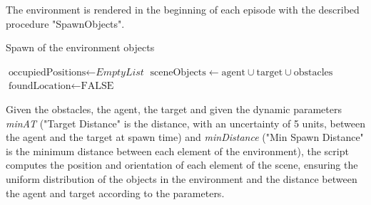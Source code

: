 \documentclass{ifacconf}
\begin{document}
The environment is rendered in the beginning of each episode with the described procedure "SpawnObjects".

\begin{algorithm}
\caption{Spawn of the environment objects}\label{alg:spawn}
\begin{algorithmic}[1]
\State $\text{occupiedPositions} \gets \textit{EmptyList}$
\State $\text{sceneObjects} \gets \text{agent} \cup \text{target} \cup \text{obstacles}$
\State $\text{foundLocation} \gets \text{FALSE}$
\Repeat
{}
\Else
{}
\EndIf
{}
\State {}
\EndFor
\EndProcedure
\end{algorithmic}
\end{algorithm}

Given the obstacles, the agent, the target and given the dynamic parameters \emph{minAT} ("Target Distance" is the distance, with an uncertainty of 5 units, between the agent and the target at spawn time) and \emph{minDistance} ("Min Spawn Distance" is the minimum distance between each element of the environment), the script computes the position and orientation of each element of the scene, ensuring the uniform distribution of the objects in the environment and the distance between the agent and target according to the parameters.
\end{document}
